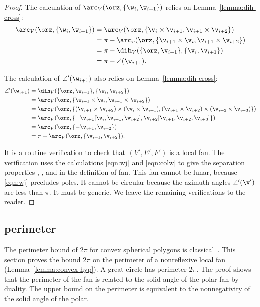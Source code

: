 \begin{proof}
The calculation of $\arc_V(\orz,\{\w_i,\w_{i+1}\})$ relies on
 Lemma~\ref{lemma:dih-cross}:
\begin{align*}
\arc_V(\orz,\{\w_i,\w_{i+1}\}) 
&= \arc_V(\orz,\{\v_i\times\v_{i+1},\v_{i+1}\times \v_{i+2}\}) \\
&=\pi - \arc_v(\orz,\{\v_{i+1}\times\v_i,\v_{i+1}\times\v_{i+2}\})\\
&=\pi - \dih_V(\{\orz,\v_{i+1}\},\{\v_i,\v_{i+1}\})\\
&=\pi - \angle(\v_{i+1}).
\end{align*}

The calculation of $\angle'(\w_{i+1})$ also relies on Lemma~\ref{lemma:dih-cross}:
\begin{align*}
\angle'(\w_{i+1}) 
&= \dih_V(\{\orz,\w_{i+1}\},\{\w_i,\w_{i+2}\}) \\
&= \arc_V (\orz,\{\w_{i+1}\times \w_{i},\w_{i+1}\times \w_{i+2}\})\\
&=\arc_V(\orz,\{ (\v_{i+1}\times \v_{i+2}) \times (\v_i\times \v_{i+1}),
   (\v_{i+1}\times \v_{i+2}) \times (\v_{i+2}\times \v_{i+3}) \})\\
&= \arc_V(\orz,\{ - \v_{i+1} [\v_i,\v_{i+1},\v_{i+2}], 
   \v_{i+2} [\v_{i+1},\v_{i+2},\v_{i+3}]\})\\
&=\arc_V(\orz,\{-\v_{i+1},\v_{i+2}\})\\
&=\pi -\arc_V(\orz,\{\v_{i+1},\v_{i+2}\}).
\end{align*}

It is a routine verification to check that $(V',E',F')$ is a local
fan.  The verification uses the calculations \eqref{eqn:wj} and
\eqref{eqn:colw} to give the separation properties ,
, and  in the definition of fan.
This fan cannot be lunar, because \eqref{eqn:wj} precludes poles.
It cannot be circular because the azimuth angles $\angle'(\v')$
are less than $\pi$.  It must be generic.
We leave the remaining verifications  to the reader.
\end{proof}
%


\subsection{perimeter}

The perimeter bound of $2\pi$ for convex spherical polygons is
classical~\cite[p.~100]{vanderWaerden:1951}.   This
section proves the bound $2\pi$ on the perimeter of a nonreflexive
local fan (Lemma~\ref{lemma:convex-hyp}).  A great circle has
perimeter $2\pi$.  The proof shows that the perimeter of the
fan is related to the solid angle of the polar fan by duality.
The upper bound on the perimeter is equivalent to the nonnegativity
of the solid angle of the polar.

